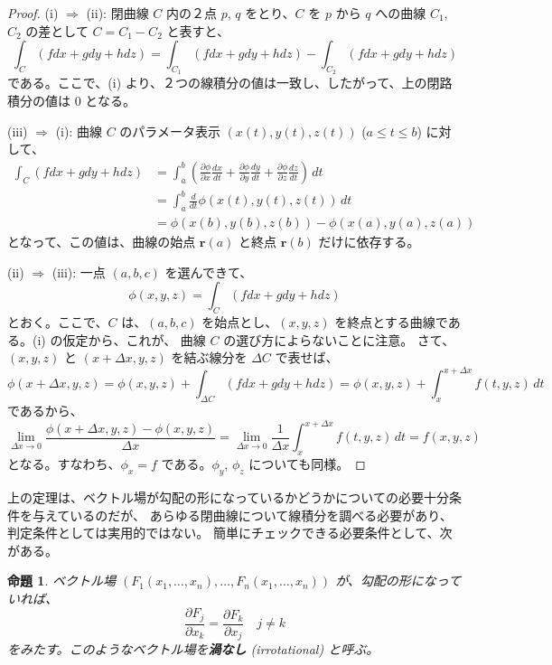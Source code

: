 \documentclass[a4paper]{jsarticle}
\newtheorem{Proposition}[Theorem]{命題}
\theoremstyle{definition}
\theoremstyle{remark}
\begin{document}
\begin{proof}
(i) $\Longrightarrow$ (ii): 閉曲線 $C$ 内の２点 $p$, $q$ をとり、$C$ を 
$p$ から $q$ への曲線 $C_1$, $C_2$ の差として $C = C_1 - C_2$ と表すと、
\[
\int_C (fdx + gdy + hdz) = \int_{C_1}(fdx + gdy + hdz) 
- \int_{C_2}(fdx + gdy + hdz)
\]
である。ここで、(i) より、２つの線積分の値は一致し、したがって、上の閉路積分の値は 
$0$ となる。

(iii) $\Longrightarrow$ (i): 
曲線 $C$ のパラメータ表示 $(x(t),y(t),z(t))$ ($a \leq t \leq b$) 
に対して、
\begin{align*}
\int_C(fdx + gdy + hdz) 
&= \int_a^b 
\left(
\frac{\partial \phi}{\partial x}\frac{dx}{dt}
+ \frac{\partial \phi}{\partial y}\frac{dy}{dt}
+ \frac{\partial \phi}{\partial z}\frac{dz}{dt}
\right)\, dt\\ 
&= \int_a^b \frac{d}{dt} \phi(x(t),y(t),z(t))\, dt\\ 
&= \phi(x(b),y(b),z(b)) - \phi(x(a),y(a),z(a))
\end{align*}
となって、この値は、曲線の始点 ${\bm r}(a)$ と終点 ${\bm r}(b)$ だけに依存する。

(ii) $\Longrightarrow$ (iii): 一点 $(a,b,c)$ を選んできて、
\[
\phi(x,y,z) = \int_C (fdx + gdy + hdz)
\]
とおく。ここで、$C$ は、$(a,b,c)$ を始点とし、$(x,y,z)$ を終点とする曲線である。(i) の仮定から、これが、
曲線 $C$ の選び方によらないことに注意。
さて、$(x,y,z)$ と $(x+\Delta x,y,z)$ を結ぶ線分を $\Delta C$ で表せば、
\[
\phi(x+\Delta x,y,z) = \phi(x,y,z) + \int_{\Delta C} (fdx + gdy + hdz) 
= \phi(x,y,z) + \int_x^{x+\Delta x} f(t,y,z)\, dt 
\]
であるから、
\[
\lim_{\Delta x \to 0} 
\frac{\phi(x+\Delta x,y,z) - \phi(x,y,z)}{\Delta x} = 
\lim_{\Delta x \to 0} \frac{1}{\Delta x} 
\int_x^{x+\Delta x} f(t,y,z)\, dt 
= f(x,y,z)
\] 
となる。すなわち、$\phi_x = f$ である。$\phi_y$, $\phi_z$ についても同様。
\end{proof} 

上の定理は、ベクトル場が勾配の形になっているかどうかについての必要十分条件を与えているのだが、
あらゆる閉曲線について線積分を調べる必要があり、判定条件としては実用的ではない。
簡単にチェックできる必要条件として、次がある。

\begin{Proposition}
ベクトル場 $(F_1(x_1,\dots, x_n), \dots, F_n(x_1,\dots, x_n))$ が、勾配の形になっていれば、
\[
\frac{\partial F_j}{\partial x_k} = \frac{\partial F_k}{\partial x_j}
\quad 
j \not= k 
\]
をみたす。このようなベクトル場を\textbf{渦なし} (irrotational) と呼ぶ。
\end{Proposition}
\end{document}
